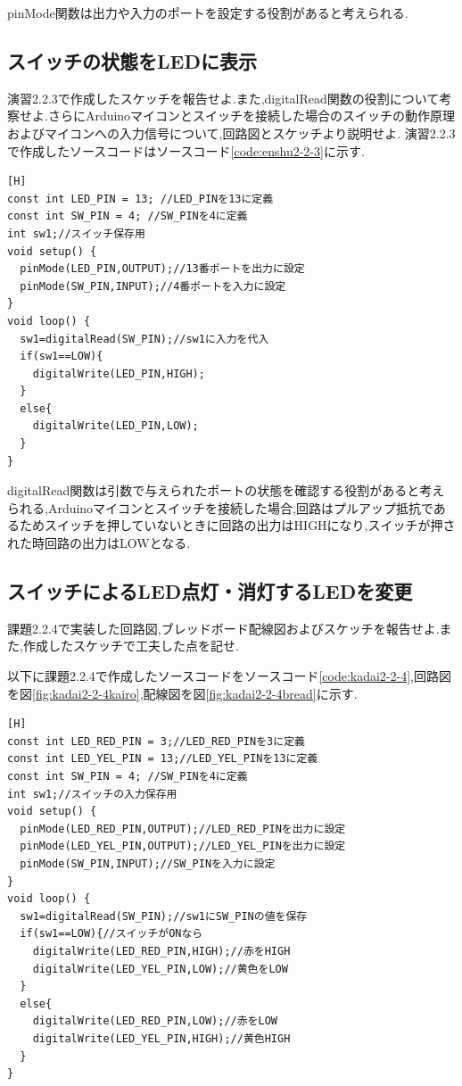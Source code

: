 \documentclass{jarticle}
\begin{document}
pinMode関数は出力や入力のポートを設定する役割があると考えられる.

\subsection{スイッチの状態をLEDに表示}
演習2.2.3で作成したスケッチを報告せよ.また,digitalRead関数の役割について考察せよ.さらにArduinoマイコンとスイッチを接続した場合のスイッチの動作原理およびマイコンへの入力信号について,回路図とスケッチより説明せよ.
演習2.2.3で作成したソースコードはソースコード\ref{code:enshu2-2-3}に示す.

\begin{lstlisting}[caption = 演習2.2.3,label=code:enshu2-2-3][H]
const int LED_PIN = 13; //LED_PINを13に定義
const int SW_PIN = 4; //SW_PINを4に定義
int sw1;//スイッチ保存用
void setup() {
  pinMode(LED_PIN,OUTPUT);//13番ポートを出力に設定
  pinMode(SW_PIN,INPUT);//4番ポートを入力に設定
}
void loop() {
  sw1=digitalRead(SW_PIN);//sw1に入力を代入
  if(sw1==LOW){
    digitalWrite(LED_PIN,HIGH);
  }
  else{
    digitalWrite(LED_PIN,LOW);
  }
}
\end{lstlisting}

digitalRead関数は引数で与えられたポートの状態を確認する役割があると考えられる,Arduinoマイコンとスイッチを接続した場合,回路はプルアップ抵抗であるためスイッチを押していないときに回路の出力はHIGHになり,スイッチが押された時回路の出力はLOWとなる.

\subsection{スイッチによるLED点灯・消灯するLEDを変更}
課題2.2.4で実装した回路図,ブレッドボード配線図およびスケッチを報告せよ.また,作成したスケッチで工夫した点を記せ.

以下に課題2.2.4で作成したソースコードをソースコード\ref{code:kadai2-2-4},回路図を図\ref{fig:kadai2-2-4kairo},配線図を図\ref{fig:kadai2-2-4bread}に示す.

\begin{lstlisting}[caption = 課題2.2.4,label=code:kadai2-2-4][H]
const int LED_RED_PIN = 3;//LED_RED_PINを3に定義
const int LED_YEL_PIN = 13;//LED_YEL_PINを13に定義
const int SW_PIN = 4; //SW_PINを4に定義
int sw1;//スイッチの入力保存用
void setup() {
  pinMode(LED_RED_PIN,OUTPUT);//LED_RED_PINを出力に設定
  pinMode(LED_YEL_PIN,OUTPUT);//LED_YEL_PINを出力に設定
  pinMode(SW_PIN,INPUT);//SW_PINを入力に設定
}
void loop() {
  sw1=digitalRead(SW_PIN);//sw1にSW_PINの値を保存
  if(sw1==LOW){//スイッチがONなら
    digitalWrite(LED_RED_PIN,HIGH);//赤をHIGH
    digitalWrite(LED_YEL_PIN,LOW);//黄色をLOW
  }
  else{
    digitalWrite(LED_RED_PIN,LOW);//赤をLOW
    digitalWrite(LED_YEL_PIN,HIGH);//黄色HIGH
  }
}
\end{lstlisting}
\end{document}
